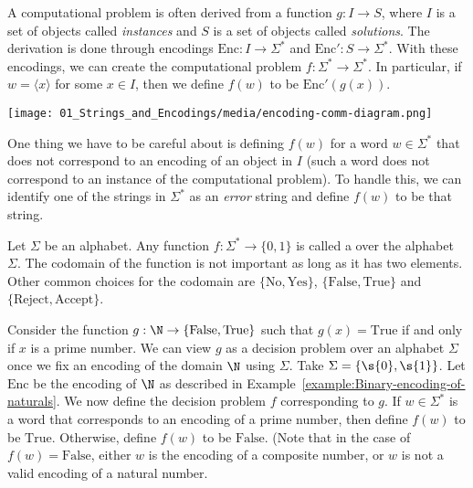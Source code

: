 \begin{important} \label{important:Computational-problem-as-mapping-instances-to-solutions}
A computational problem is often derived from a function $g: I \to S$, where $I$ is a set of objects called \emph{instances} and $S$ is a set of objects called \emph{solutions}. 
The derivation is done through encodings $\text{Enc}: I \to \Sigma^*$ and $\text{Enc}': S \to \Sigma^*$. 
With these encodings, we can create the computational problem $f : \Sigma^* \to \Sigma^*$. 
In particular, if $w = \langle x \rangle$ for some $x \in I$, then we define $f(w)$ to be $\text{Enc}'(g(x))$.

\begin{center}
\texttt{[image: 01\_Strings\_and\_Encodings/media/encoding-comm-diagram.png]}
\end{center}

One thing we have to be careful about is defining $f(w)$ for a word $w \in \Sigma^*$ that does not correspond to an encoding of an object in $I$ (such a word does not correspond to an instance of the computational problem). 
To handle this, we can identify one of the strings in $\Sigma^*$ as an \emph{error} string and define $f(w)$ to be that string.
\end{important}


\begin{flex}
\begin{definition} \label{definition:Decision-problem}
Let $\Sigma$ be an alphabet. Any function $f: \Sigma^* \to \{0,1\}$ is called a  over the alphabet $\Sigma$. 
The codomain of the function is not important as long as it has two elements. 
Other common choices for the codomain are $\{\text{No}, \text{Yes}\}$, $\{\text{False}, \text{True}\}$ and $\{ \text{Reject}, \text{Accept}\}$.
\end{definition}

\begin{example} \label{example:Primality-testing-as-a-decision-problem}
Consider the function $g:\N \to \{\text{False}, \text{True}\}$ such that $g(x) = \text{True}$ if and only if $x$ is a prime number.
We can view $g$ as a decision problem over an alphabet $\Sigma$ once we fix an encoding of the domain $\N$ using $\Sigma$. 
Take $\Sigma = \{\s{0},\s{1}\}$. 
Let $\text{Enc}$ be the encoding of $\N$ as described in Example~\ref{example:Binary-encoding-of-naturals}. 
We now define the decision problem $f$ corresponding to $g$. 
If $w \in \Sigma^*$ is a word that corresponds to an encoding of a prime number, then define $f(w)$ to be $\text{True}$. Otherwise, define $f(w)$ to be $\text{False}$. (Note that in the case of $f(w) = \text{False}$, either $w$ is the encoding of a composite number, or $w$ is not a valid encoding of a natural number.
\end{example}
\end{flex}


